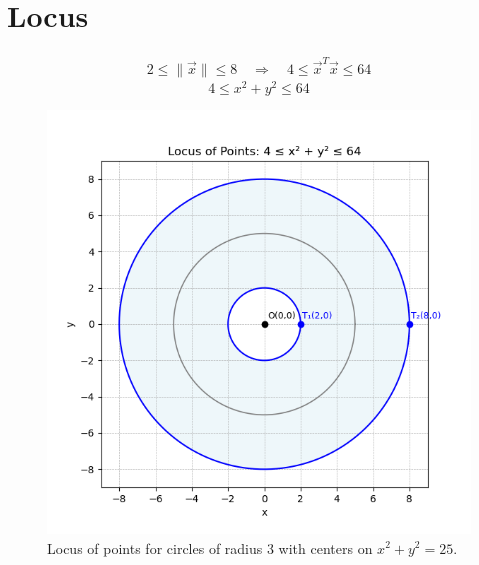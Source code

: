 \documentclass[a4paper,12pt]{article}
\begin{document}
\section*{Locus}
\begin{align}
2 \le \|\vec{x}\| \le 8
\quad \Rightarrow \quad
4 \le \vec{x}^T\vec{x} \le 64
\end{align}
\[
\boxed{4 \le x^2 + y^2 \le 64}
\]
\begin{figure}[h!]
    \centering
    \includegraphics[width=0.7\linewidth]{Figs/Figure_1.png}
    \caption{Locus of points for circles of radius 3 with centers on $x^2 + y^2 = 25$.}
    \label{fig:locus}
\end{figure}
\end{document}
